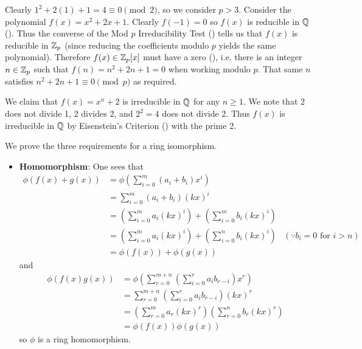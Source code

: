 \begin{questions}
    \item Clearly $1^2 + 2(1) + 1 = 4 \equiv 0 \pmod2$, so we consider $p > 3$. Consider the polynomial $f(x) = x^2 + 2x + 1$. Clearly $f(-1) = 0$ so $f(x)$ is reducible in $\mathbb{Q}$ (). Thus the converse of the Mod $p$ Irreducibility Test () tells us that $f(x)$ is reducible in $\mathbb{Z}_p$ (since reducing the coefficients modulo $p$ yields the same polynomial). Therefore $f(x) \in \mathbb{Z}_p[x]$ must have a zero (), i.e. there is an integer $n \in \mathbb{Z}_p$ such that $f(n) = n^2 + 2n + 1 = 0$ when working modulo $p$. That same $n$ satisfies $n^2 + 2n + 1 \equiv 0 \pmod{p}$ as required.
    
    \item We claim that $f(x) = x^n + 2$ is irreducible in $\mathbb{Q}$ for any $n \geq 1$. We note that 2 does not divide 1, 2 divides 2, and $2^2 = 4$ does not divide 2. Thus $f(x)$ is irreducible in $\mathbb{Q}$ by Eisenstein's Criterion () with the prime 2.
    
    \item We prove the three requirements for a ring isomorphism.
    \begin{itemize}
        \item \textbf{Homomorphism}: One sees that
        \begin{align*}
            \phi(f(x) + g(x)) &= \phi\left(\sum_{i=0}^m(a_i+b_i)x^i\right)\\
            &= \sum_{i=0}^m(a_i+b_i)(kx)^i\\
            &= \left(\sum_{i=0}^ma_i(kx)^i\right) + \left(\sum_{i=0}^mb_i(kx)^i\right)\\
            &= \left(\sum_{i=0}^ma_i(kx)^i\right) + \left(\sum_{i=0}^nb_i(kx)^i\right) & (\because b_i = 0 \text{ for } i > n)\\
            &= \phi(f(x)) + \phi(g(x))
        \end{align*}
        and
        \begin{align*}
            \phi(f(x)g(x)) &= \phi\left(\sum_{r=0}^{m+n}\left(\sum_{i=0}^ra_ib_{r-i}\right)x^r\right)\\
            &= \sum_{r=0}^{m+n}\left(\sum_{i=0}^ra_ib_{r-i}\right)(kx)^r\\
            &= \left(\sum_{r=0}^ma_r(kx)^r\right)\left(\sum_{r=0}^nb_r(kx)^r\right)\\
            &= \phi(f(x))\phi(g(x))
        \end{align*}
        so $\phi$ is a ring homomorphism.
        

\end{itemize}
\end{questions}
